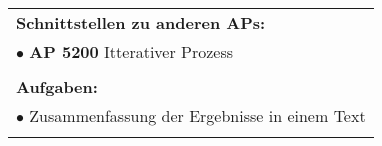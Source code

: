 \begin{table}[!h]
\begin{center}
\begin{tabular}{|p{35mm}||p{55mm}|p{50mm}||p{40mm}|}
   \multicolumn{4}{|p{150mm}|}{\textbf{Schnittstellen zu anderen APs:}}\\
   \multicolumn{4}{|p{150mm}|}{$\bullet$ \textbf{AP 5200} Itterativer Prozess}\\
   \multicolumn{4}{|p{150mm}|}{}\\
   \multicolumn{4}{|p{150mm}|}{\textbf{Aufgaben:}}\\
   \multicolumn{4}{|p{150mm}|}{$\bullet$ Zusammenfassung der Ergebnisse in einem Text}\\
   \multicolumn{4}{|p{150mm}|}{}\\
   \hline
  \end{tabular}
 \end{center}
\end{table}

